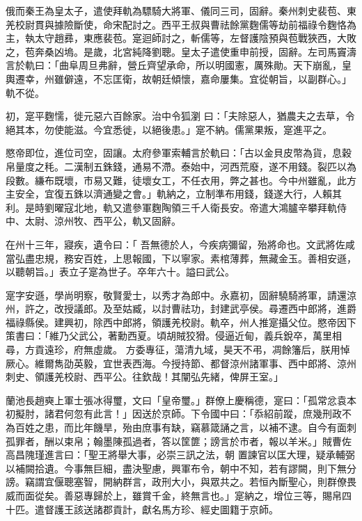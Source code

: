 \begin{pinyinscope}
 俄而秦王為皇太子，遣使拜軌為驃騎大將軍、儀同三司，固辭。秦州刺史裴苞、東羌校尉貫與據險斷使，命宋配討之。西平王叔與曹祛餘黨麴儒等劫前福祿令麴恪為主，執太守趙彞，東應裴苞。寔迴師討之，斬儒等，左督護陰預與苞戰狹西，大敗之，苞奔桑凶塢。是歲，北宮純降劉聰。皇太子遣使重申前授，固辭。左司馬竇濤言於軌曰：「曲阜周旦弗辭，營丘齊望承命，所以明國憲，厲殊勛。天下崩亂，皇輿遷幸，州雖僻遠，不忘匡衛，故朝廷傾懷，嘉命屢集。宜從朝旨，以副群心。」軌不從。



 初，寔平麴懦，徙元惡六百餘家。治中令狐瀏
 曰：「夫除惡人，猶農夫之去草，令絕其本，勿使能滋。今宜悉徙，以絕後患。」寔不納。儒黨果叛，寔進平之。



 愍帝即位，進位司空，固讓。太府參軍索輔言於軌曰：「古以金貝皮幣為貨，息穀帛量度之秏。二漢制五銖錢，通易不滯。泰始中，河西荒廢，遂不用錢。裂匹以為段數。縑布既壞，市易又難，徒壞女工，不任衣用，弊之甚也。今中州雖亂，此方主安全，宜復五銖以濟通變之會。」軌納之，立制準布用錢，錢遂大行，人賴其利。是時劉曜寇北地，軌又遣參軍麴陶領三千人衛長安。帝遣大鴻臚辛攀拜軌侍中、太尉、涼州牧、西平公，軌又固辭。



 在州十三年，寢疾，遺令曰：「
 吾無德於人，今疾病彌留，殆將命也。文武將佐咸當弘盡忠規，務安百姓，上思報國，下以寧家。素棺薄葬，無藏金玉。善相安遜，以聽朝旨。」表立子寔為世子。卒年六十。謚曰武公。



 寔字安遜，學尚明察，敬賢愛士，以秀才為郎中。永嘉初，固辭驍騎將軍，請還涼州，許之，改授議郎。及至姑臧，以討曹祛功，封建武亭侯。尋遷西中郎將，進爵福祿縣侯。建興初，除西中郎將，領護羌校尉。軌卒，州人推寔攝父位。愍帝因下策書曰：「維乃父武公，著勳西夏。頃胡賊狡猾。侵逼近甸，義兵銳卒，萬里相尋，方貢遠珍，府無虛歲。
 方委專征，蕩清九域，昊天不弔，凋餘籓后，朕用悼厥心。維爾雋劭英毅，宜世表西海。今授持節、都督涼州諸軍事、西中郎將、涼州刺史、領護羌校尉、西平公。往欽哉！其闡弘先緒，俾屏王室。」



 蘭池長趙奭上軍士張冰得璽，文曰「皇帝璽。」群僚上慶稱德，寔曰：「孤常忿袁本初擬肘，諸君何忽有此言！」因送於京師。下令國中曰：「忝紹前蹤，庶幾刑政不為百姓之患，而比年饑旱，殆由庶事有缺，竊慕箴誦之言，以補不逮。自今有面刺孤罪者，酬以束帛；翰墨陳孤過者，答以筐篚；謗言於市者，報以羊米。」賊曹佐高昌隗瑾進言曰：「聖王將舉大事，必崇三訊之法，朝
 置諫官以匡大理，疑承輔弼以補闕拾遺。今事無巨細，盡決聖慮，興軍布令，朝中不知，若有謬闕，則下無分謗。竊謂宜偃聰塞智，開納群言，政刑大小，與眾共之。若恒內斷聖心，則群僚畏威而面從矣。善惡專歸於上，雖賞千金，終無言也。」寔納之，增位三等，賜帛四十匹。遣督護王該送諸郡貢計，獻名馬方珍、經史圖籍于京師。




\end{pinyinscope}
